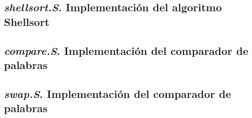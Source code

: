 \documentclass{article}
\begin{document}
\begin{appendices}
\subsection{\textit{shellsort.S}. Implementación del algoritmo Shellsort}
%  
\bigskip\bigskip

\subsection{\textit{compare.S}. Implementación del comparador de palabras}
%  
\bigskip\bigskip

\subsection{\textit{swap.S}. Implementación del comparador de palabras}
%  
\bigskip\bigskip


\end{appendices}
\end{document}
